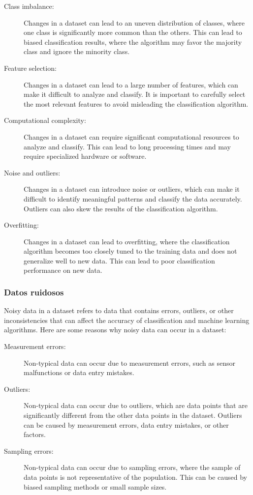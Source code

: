 \documentclass[12pt,a4paper, brazil]{article}
\begin{document}
    
\begin{description}
  \item[Class imbalance:] Changes in a dataset can lead to an uneven distribution of classes, where one class is significantly more common than the others. This can lead to biased classification results, where the algorithm may favor the majority class and ignore the minority class.
  
  \item[Feature selection:] Changes in a dataset can lead to a large number of features, which can make it difficult to analyze and classify. It is important to carefully select the most relevant features to avoid misleading the classification algorithm.
  
  \item[Computational complexity:] Changes in a dataset can require significant computational resources to analyze and classify. This can lead to long processing times and may require specialized hardware or software.
  
  \item[Noise and outliers:] Changes in a dataset can introduce noise or outliers, which can make it difficult to identify meaningful patterns and classify the data accurately. Outliers can also skew the results of the classification algorithm.
  
  \item[Overfitting:] Changes in a dataset can lead to overfitting, where the classification algorithm becomes too closely tuned to the training data and does not generalize well to new data. This can lead to poor classification performance on new data.
\end{description}
        
        \subsubsection{Datos ruidosos}
        Noisy data in a dataset refers to data that contains errors, outliers, or other inconsistencies that can affect the accuracy of classification and machine learning algorithms. Here are some reasons why noisy data can occur in a dataset:

    \begin{description}
  \item[Measurement errors:] Non-typical data can occur due to measurement errors, such as sensor malfunctions or data entry mistakes.

  \item[Outliers:] Non-typical data can occur due to outliers, which are data points that are significantly different from the other data points in the dataset. Outliers can be caused by measurement errors, data entry mistakes, or other factors.

  \item[Sampling errors:] Non-typical data can occur due to sampling errors, where the sample of data points is not representative of the population. This can be caused by biased sampling methods or small sample sizes.
\end{description}
\end{document}
